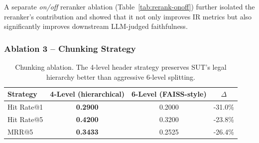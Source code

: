 \documentclass[11pt, a4paper]{article}
\begin{document}
A separate \textit{on/off} reranker ablation (Table~\ref{tab:rerank-onoff}) further isolated the reranker's contribution and showed that it not only improves IR metrics but also significantly improves downstream LLM-judged faithfulness.

\begin{table}[H]
    \centering
    \footnotesize
    \caption{Reranker on/off ablation -- identical pgvector index, identical embeddings, identical $k$. Source: \texttt{ablation\_results.json}.}
    \label{tab:rerank-onoff}
\end{table}

\subsubsection{Ablation 3 -- Chunking Strategy}

\begin{table}[H]
    \centering
    \small
    \begin{tabular}{lccc}
        \toprule
        \textbf{Strategy} & \textbf{4-Level (hierarchical)} & \textbf{6-Level (FAISS-style)} & \textbf{$\Delta$}\\
        \midrule
        Hit Rate@1 & \textbf{0.2900} & 0.2000 & -31.0\%\\
        Hit Rate@5 & \textbf{0.4200} & 0.3200 & -23.8\%\\
        MRR@5      & \textbf{0.3433} & 0.2525 & -26.4\%\\
        \bottomrule
    \end{tabular}
    \caption{Chunking ablation. The 4-level header strategy preserves SUT's legal hierarchy better than aggressive 6-level splitting.}
\end{table}
\end{document}
